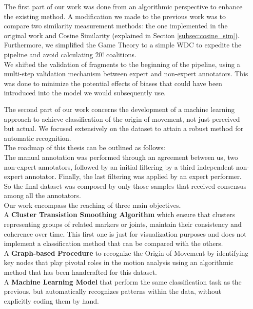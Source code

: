 The first part of our work was done from an algorithmic perspective to enhance the existing method.
A modification we made to the previous work was to compare two similarity measurement methods: the one implemented in the original work and Cosine Similarity (explained in Section \ref{subsec:cosine_sim}).\\
Furthermore, we simplified the Game Theory to a simple WDC to expedite the pipeline and avoid calculating $20!$ coalitions.\\
We shifted the validation of fragments to the beginning of the pipeline, using a multi-step validation mechanism between expert and non-expert annotators. 
This was done to minimize the potential effects of biases that could have been introduced into the model we would subsequently use.

The second part of our work concerns the development of a machine learning approach to achieve classification of the origin of movement, not just perceived but actual. 
We focused extensively on the dataset to attain a robust method for automatic recognition.\\

The roadmap of this thesis can be outlined as follows: \\
The manual annotation was performed through an agreement between us, two non-expert annotators, followed by an initial filtering by a third independent non-expert annotator.
Finally, the last filtering was applied by an expert performer.
So the final dataset was composed by only those samples that received consensus among all the annotators.
\\
Our work encompass the reaching of three main objectives.\\
A \textbf{Cluster Transistion Smoothing Algorithm} which ensure that clusters representing groups of related markers or joints, maintain their consistency and coherence over time.
This first one is just for visualization purposes and does not implement a classification method that can be compared with the others.\\
A \textbf{Graph-based Procedure} to recognize the Origin of Movement by identifying key nodes that play pivotal roles in the motion analysis using an algorithmic method that has been handcrafted for this dataset.\\
A \textbf{Machine Learning Model} that perform the same classification task as the previous, but automatically recognizes patterns within the data, without explicitly coding them by hand.

